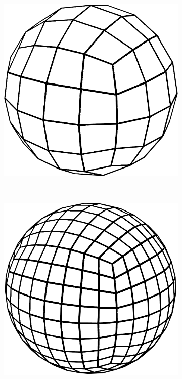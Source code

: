 \begin{figure}
\begin{subfigure}[b]{0.2\textwidth}
    \end{subfigure}
    ~ %
    \begin{subfigure}[b]{0.2\textwidth}
        \includegraphics[width=\textwidth]{figures/tessellation/tessellation_cube3.png}
    \end{subfigure}
    ~ %
    \begin{subfigure}[b]{0.2\textwidth}
        \includegraphics[width=\textwidth]{figures/tessellation/tessellation_cube4.png}

\end{subfigure}
\end{figure}
